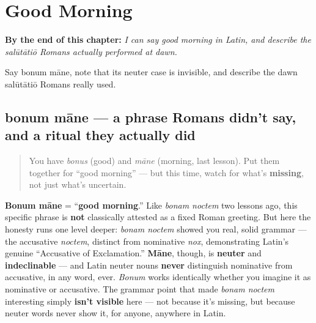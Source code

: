
\chapter{Good Morning}
\label{ch:la-good-morning}

\begin{chapteropening}
\textbf{By the end of this chapter:} \emph{I can say good morning in Latin, and describe the salūtātiō Romans actually performed at dawn.}

Say bonum māne, note that its neuter case is invisible, and describe the dawn salūtātiō Romans really used.
\end{chapteropening}

\section[bonum māne]{bonum māne — a phrase Romans didn't say, and a ritual they actually did}

\label{lesson:LA-C32-bonum-mane}



\begin{quote}
You have \emph{bonus} (good) and \emph{māne} (morning, last lesson). Put them together for \textquotedblleft{}good morning\textquotedblright{} — but this time, watch for what's \textbf{missing}, not just what's uncertain.
\end{quote}

\begin{culture}
\textbf{Bonum māne} = \textquotedblleft{}\textbf{good morning}.\textquotedblright{} Like \emph{bonam noctem} two lessons ago, this specific phrase is \textbf{not} classically attested as a fixed Roman greeting. But here the honesty runs one level deeper: \emph{bonam noctem} showed you real, solid grammar — the accusative \emph{noctem}, distinct from nominative \emph{nox}, demonstrating Latin's genuine \textquotedblleft{}Accusative of Exclamation.\textquotedblright{} \textbf{Māne}, though, is \textbf{neuter} and \textbf{indeclinable} — and Latin neuter nouns \textbf{never} distinguish nominative from accusative, in any word, ever. \emph{Bonum} works identically whether you imagine it as nominative or accusative. The grammar point that made \emph{bonam noctem} interesting simply \textbf{isn't visible} here — not because it's missing, but because neuter words never show it, for anyone, anywhere in Latin.
\end{culture}

